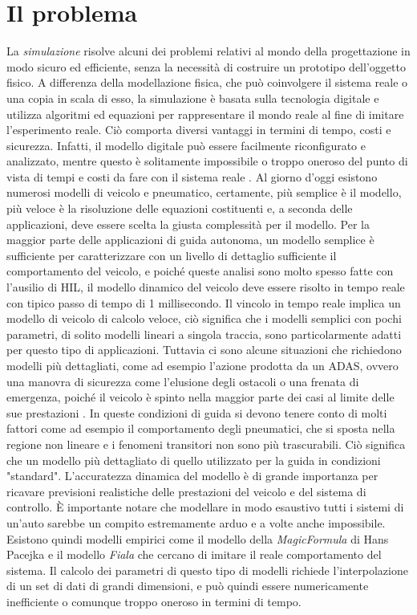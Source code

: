 \section{Il problema}
La \textit{simulazione} risolve alcuni dei problemi relativi al mondo della progettazione in modo sicuro ed efficiente, senza la necessità di costruire un prototipo dell'oggetto fisico. A differenza della modellazione fisica, che può coinvolgere il sistema reale o una copia in scala di esso, la simulazione è basata sulla tecnologia digitale e utilizza algoritmi ed equazioni per rappresentare il mondo reale al fine di imitare l'esperimento reale. Ciò comporta diversi vantaggi in termini di tempo, costi e sicurezza. Infatti, il modello digitale può essere facilmente riconfigurato e analizzato, mentre questo è solitamente impossibile o troppo oneroso del punto di vista di tempi e costi da fare con il sistema reale \cite{Anu}. Al giorno d'oggi esistono numerosi modelli di veicolo e pneumatico, certamente, più semplice è il modello, più veloce è la risoluzione delle equazioni costituenti e, a seconda delle applicazioni, deve essere scelta la giusta complessità per il modello. Per la maggior parte delle applicazioni di guida autonoma, un modello semplice è sufficiente per caratterizzare con un livello di dettaglio sufficiente il comportamento del veicolo, e poiché queste analisi sono molto spesso fatte con l'ausilio di \ac{HIL}, il modello dinamico del veicolo deve essere risolto in tempo reale con tipico passo di tempo di 1 millisecondo. Il vincolo in tempo reale implica un modello di veicolo di calcolo veloce, ciò significa che i modelli semplici con pochi parametri, di solito modelli lineari a singola traccia, sono particolarmente adatti per questo tipo di applicazioni. Tuttavia ci sono alcune situazioni che richiedono modelli più dettagliati, come ad esempio l'azione prodotta da un \ac{ADAS}, ovvero una manovra di sicurezza come l'elusione degli ostacoli o una frenata di emergenza, poiché il veicolo è spinto nella maggior parte dei casi al limite delle sue prestazioni \cite{impacts}. In queste condizioni di guida si devono tenere conto di molti fattori come ad esempio il comportamento degli pneumatici, che si sposta nella regione non lineare e i fenomeni transitori non sono più trascurabili. Ciò significa che un modello più dettagliato di quello utilizzato per la guida in condizioni "standard". L'accuratezza dinamica del modello è di grande importanza per ricavare previsioni realistiche delle prestazioni del veicolo e del sistema di controllo. È importante notare che modellare in modo esaustivo tutti i sistemi di un'auto sarebbe un compito estremamente arduo e a volte anche impossibile. Esistono quindi modelli empirici come il modello della \textit{MagicFormula} di Hans Pacejka e il modello \textit{Fiala} che cercano di imitare il reale comportamento del sistema. Il calcolo dei parametri di questo tipo di modelli richiede l'interpolazione di un set di dati di grandi dimensioni, e può quindi essere numericamente inefficiente o comunque troppo oneroso in termini di tempo.\\
